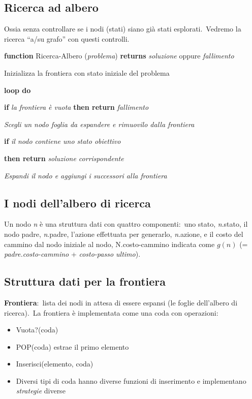 \subsection{Ricerca ad albero}
Ossia senza controllare se i nodi (stati) siano già stati esplorati.\
Vedremo la ricerca ``a/su grafo'' con questi controlli.
\begin{flushleft}
	\textbf{function} Ricerca-Albero (\textit{problema}) \textbf{returns} \textit{soluzione} oppure \textit{fallimento}

	\quad Inizializza la frontiera con stato iniziale del problema

	\quad \textbf{loop do}

	\quad \qquad \textbf{if} \textit{la frontiera è vuota} \textbf{then return}  \textit{fallimento}

	\quad \qquad \textit{Scegli un nodo foglia da espandere e rimuovilo dalla  frontiera}

	\quad \qquad \textbf{if} \textit{il nodo contiene uno stato obiettivo}

	\quad \qquad \quad \textbf{then return} \textit{soluzione corrispondente}

	\quad \qquad \textit{Espandi il nodo e aggiungi i successori alla frontiera}

	\quad \end{flushleft}

\subsection{I nodi dell'albero di ricerca}

Un nodo \textit{n} è una struttura dati con quattro componenti:\ uno stato, \textit{n}.stato, il nodo padre, \textit{n}.padre, l'azione effettuata per generarlo, \textit{n}.azione, e il costo del cammino dal nodo iniziale al nodo, N.costo-cammino indicata come $g(n)$ (= \textit{padre.costo-cammino} + \textit{costo-passo ultimo}).

\subsection{Struttura dati per la frontiera}

\textbf{Frontiera}:\ lista dei nodi in attesa di essere espansi (le foglie dell'albero di ricerca).\
La frontiera è implementata come una coda con operazioni:
\begin{itemize}
	\item Vuota?(coda)
	\item POP(coda) estrae il primo elemento
	\item Inserisci(elemento, coda)
	\item Diversi tipi di coda hanno diverse funzioni di inserimento e implementano \textit{strategie} diverse
\end{itemize}

